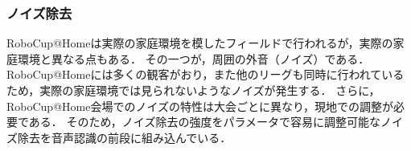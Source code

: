 \documentclass[a4j]{jarticle}
\begin{document}
\subsubsection{ノイズ除去}
RoboCup@Homeは実際の家庭環境を模したフィールドで行われるが，実際の家庭環境と異なる点もある．
その一つが，周囲の外音（ノイズ）である．
RoboCup@Homeには多くの観客がおり，また他のリーグも同時に行われているため，実際の家庭環境では見られないようなノイズが発生する．
さらに，RoboCup@Home会場でのノイズの特性は大会ごとに異なり，現地での調整が必要である．
そのため，ノイズ除去の強度をパラメータで容易に調整可能なノイズ除去\cite{sainburg2020finding}を音声認識の前段に組み込んでいる．

%
\end{document}
